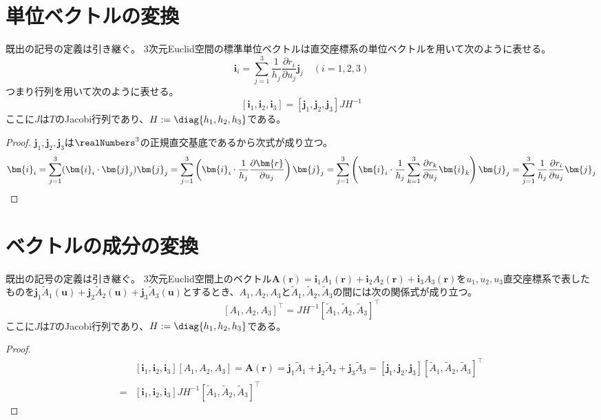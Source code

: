     \section{単位ベクトルの変換}
        \label{単位ベクトルの変換}
        \begin{shadebox}
            既出の記号の定義は引き継ぐ。
            3次元Euclid空間の標準単位ベクトルは直交座標系の単位ベクトルを用いて次のように表せる。
            \[ \bm{i}_i = \sum_{j=1}^3 \frac{1}{h_j}\frac{\partial r_i}{\partial u_j}\bm{j}_j \quad (i=1,2,3) \]
            つまり行列を用いて次のように表せる。
            \[ [\bm{i}_1, \bm{i}_2, \bm{i}_3] = [\bm{j}_1, \bm{j}_2, \bm{j}_3]JH^{-1} \]
            ここに$J$は$T$のJacobi行列であり、$H := \diag{h_1,h_2,h_3}$である。
        \end{shadebox}
        \begin{proof}
            \quad\par
            $\bm{j}_1,\bm{j}_2,\bm{j}_3$は$\realNumbers^3$の正規直交基底であるから次式が成り立つ。
            \[ \bm{i}_i = \sum_{j=1}^3 (\bm{i}_i\cdot\bm{j}_j)\bm{j}_j = \sum_{j=1}^3 \left(\bm{i}_i\cdot\frac{1}{h_j}\frac{\partial \bm{r}}{\partial u_j}\right)\bm{j}_j = \sum_{j=1}^3 \left(\bm{i}_i\cdot\frac{1}{h_j}\sum_{k=1}^3\frac{\partial r_k}{\partial u_j}\bm{i}_k\right)\bm{j}_j \\
            = \sum_{j=1}^3 \frac{1}{h_j}\frac{\partial r_i}{\partial u_j}\bm{j}_j \]
        \end{proof}
    \section{ベクトルの成分の変換}
        \label{ベクトルの成分の変換}
        \begin{shadebox}
            既出の記号の定義は引き継ぐ。
            3次元Euclid空間上のベクトル$\bm{A}(\bm{r}) = \bm{i}_1 A_1(\bm{r}) + \bm{i}_2 A_2(\bm{r}) + \bm{i}_3 A_3(\bm{r})$を$u_1,u_2,u_3$直交座標系で表したものを$\bm{j}_1 \tilde{A}_1(\bm{u}) + \bm{j}_2 \tilde{A}_2(\bm{u}) + \bm{j}_3 \tilde{A}_3(\bm{u})$とするとき、$A_1,A_2,A_3$と$\tilde{A}_1,\tilde{A}_2,\tilde{A}_3$の間には次の関係式が成り立つ。
            \[ [A_1,A_2,A_3]^\top = JH^{-1}[\tilde{A}_1,\tilde{A}_2,\tilde{A}_3]^\top \]
            ここに$J$は$T$のJacobi行列であり、$H := \diag{h_1,h_2,h_3}$である。
        \end{shadebox}
        \begin{proof}
            \begin{align*}
                \phantom{=} &[\bm{i}_1,\bm{i}_2,\bm{i}_3][A_1,A_2,A_3] = \bm{A}(\bm{r}) = \bm{j}_1 \tilde{A}_1 + \bm{j}_2 \tilde{A}_2 + \bm{j}_3 \tilde{A}_3 = [\bm{j}_1,\bm{j}_2,\bm{j}_3][\tilde{A}_1,\tilde{A}_2,\tilde{A}_3]^\top \\
                = &[\bm{i}_1,\bm{i}_2,\bm{i}_3]JH^{-1}[\tilde{A}_1,\tilde{A}_2,\tilde{A}_3]^\top
            \end{align*}
        \end{proof}
